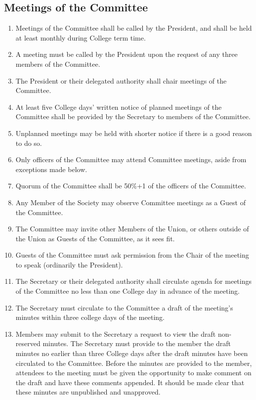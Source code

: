 \documentclass[a4paper]{tufte-handout}
\newcommand{\policyOffset}{12pt}
\newcommand{\policyBye}[2][\policyOffset]{\marginnote[#1]{\textsc{Bye-laws \S#2}}}
\begin{document}
\subsection{Meetings of the Committee}
\begin{enumerate}[resume]
    \item Meetings of the Committee shall be called by the President, and shall be held at least monthly during College term time.
    \item A meeting must be called by the President upon the request of any three members of the Committee.
    \item The President or their delegated authority shall chair meetings of the Committee.
    \item At least five College days' written notice of planned meetings of the Committee shall be provided by the Secretary to members of the Committee.
    \item Unplanned meetings may be held with shorter notice if there is a good reason to do so.
    \item Only officers of the Committee may attend Committee meetings, aside from exceptions made below.
    \item \policyBye{B11} Quorum of the Committee shall be 50\%+1 of the officers of the Committee.
    \item Any Member of the Society may observe Committee meetings as a Guest of the Committee.
    \item The Committee may invite other Members of the Union, or others outside of the Union as Guests of the Committee, as it sees fit.
    \item Guests of the Committee must ask permission from the Chair of the meeting to speak (ordinarily the President).
    \item The Secretary or their delegated authority shall circulate agenda for meetings of the Committee no less than one College day in advance of the meeting.
    \item The Secretary must circulate to the Committee a draft of the meeting's minutes within three college days of the meeting.
    \item Members may submit to the Secretary a request to view the draft non-reserved minutes. The Secretary must provide to the member the draft minutes no earlier than three College days after the draft minutes have been circulated to the Committee. Before the minutes are provided to the member, attendees to the meeting must be given the opportunity to make comment on the draft and have these comments appended. It should be made clear that these minutes are unpublished and unapproved.

\end{enumerate}
\end{document}

